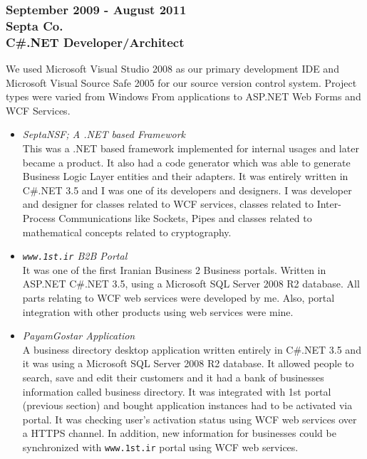 \documentclass[10pt,a4paper]{article}
\begin{document}
\subsubsection{\textnormal {September 2009 - August 2011} \\ \textnormal {Septa Co.} \\ C\#.NET Developer/Architect}
  \setlength{\leftskip}{0.5cm}
  \setlength{\rightskip}{1cm}
  We used Microsoft Visual Studio 2008 as our primary development IDE and Microsoft Visual Source Safe 2005 for our source version control system. Project types were varied from Windows From applications to ASP.NET Web Forms and WCF Services.
  \begin{itemize}
    \setlength{\rightskip}{2cm}
    \setlength\itemsep{0em}
		\item \small \textit{SeptaNSF; A .NET based Framework} \\
			This was a .NET based framework implemented for internal usages and later became a product. It also had a code generator which was able to generate Business Logic Layer entities and their adapters. It was entirely written in C\#.NET 3.5 and I was one of its developers and designers. I was developer and designer for classes related to WCF services, classes related to Inter-Process Communications like Sockets, Pipes and classes related to mathematical concepts related to cryptography. \\
		\item \small \textit{\texttt{www.1st.ir} B2B Portal} \\
			It was one of the first Iranian Business 2 Business portals. Written in ASP.NET C\#.NET 3.5, using a Microsoft SQL Server 2008 R2 database. All parts relating to WCF web services were developed by me. Also, portal integration with other products using web services were mine. \\
		\item \small \textit{PayamGostar Application} \\
			A business directory desktop application written entirely in C\#.NET 3.5 and it was using a Microsoft SQL Server 2008 R2 database. It allowed people to search, save and edit their customers and it had a bank of businesses information called business directory. It was integrated with 1st portal (previous section) and bought application instances had to be activated via portal. It was checking user's activation status using WCF web services over a HTTPS channel. In addition, new information for businesses could be synchronized with \texttt{www.1st.ir} portal using WCF web services. \\

\end{itemize}
\end{document}
